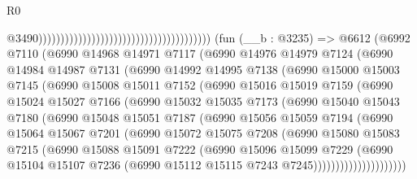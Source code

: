 \begin{lexlean}{R0}
\begin{coremodule}
                                                                                  @3490)))))))))))))))))))))))))))))))))))))))
    (fun (__b : @3235) =>
    @6612
      (@6992
        @7110
        (@6990
          @14968
          @14971
          @7117
          (@6990
            @14976
            @14979
            @7124
            (@6990
              @14984
              @14987
              @7131
              (@6990
                @14992
                @14995
                @7138
                (@6990
                  @15000
                  @15003
                  @7145
                  (@6990
                    @15008
                    @15011
                    @7152
                    (@6990
                      @15016
                      @15019
                      @7159
                      (@6990
                        @15024
                        @15027
                        @7166
                        (@6990
                          @15032
                          @15035
                          @7173
                          (@6990
                            @15040
                            @15043
                            @7180
                            (@6990
                              @15048
                              @15051
                              @7187
                              (@6990
                                @15056
                                @15059
                                @7194
                                (@6990
                                  @15064
                                  @15067
                                  @7201
                                  (@6990
                                    @15072
                                    @15075
                                    @7208
                                    (@6990
                                      @15080
                                      @15083
                                      @7215
                                      (@6990
                                        @15088
                                        @15091
                                        @7222
                                        (@6990
                                          @15096
                                          @15099
                                          @7229
                                          (@6990
                                            @15104
                                            @15107
                                            @7236
                                            (@6990 @15112 @15115 @7243 @7245)))))))))))))))))))))

\end{coremodule}
\end{lexlean}
